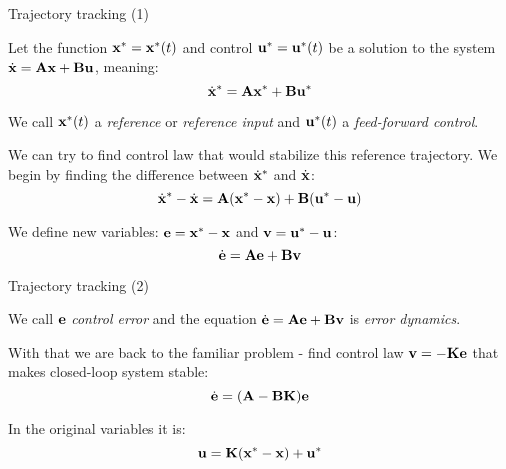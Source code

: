 \documentclass{beamer}
\begin{document}
\begin{frame}{Trajectory tracking (1)}
	\begin{flushleft}
		
		Let the function $\mathbf{x}^* = \mathbf{x}^*(t)$ and control $\mathbf{u}^* = \mathbf{u}^*(t)$ be a solution to the system $\dot{\mathbf{x}} = \mathbf{A}\mathbf{x} + \mathbf{B}\mathbf{u}$, meaning:
		\begin{equation}
			\dot{\mathbf{x}}^* = \mathbf{A}\mathbf{x}^* + \mathbf{B}\mathbf{u}^*
		\end{equation}
	
		We call $\mathbf{x}^*(t)$ a \emph{reference} or \emph{reference input} and $\mathbf{u}^*(t)$ a \emph{feed-forward control}.
		
		\bigskip
		
		We can try to find control law that would stabilize this reference trajectory. We begin by finding the difference between $\dot{\mathbf{x}}^*$ and $\dot{\mathbf{x}}$:
		\begin{equation}
			\dot{\mathbf{x}}^* - \dot{\mathbf{x}}= \mathbf{A}(\mathbf{x}^*-\mathbf{x}) + \mathbf{B}(\mathbf{u}^*-\mathbf{u})
		\end{equation}
		
		We define new variables: $\mathbf{e} = \mathbf{x}^* - \mathbf{x}$ and $\mathbf{v} = \mathbf{u}^* - \mathbf{u}$:
		\begin{equation}
			\dot{\mathbf{e}} = \mathbf{A}\mathbf{e} + \mathbf{B}\mathbf{v}
		\end{equation}
		
	\end{flushleft}
\end{frame}



\begin{frame}{Trajectory tracking (2)}
	\begin{flushleft}
		
		We call $\mathbf{e}$ \emph{control error} and the equation $\dot{\mathbf{e}} = \mathbf{A}\mathbf{e} + \mathbf{B}\mathbf{v}$ is \emph{error dynamics}.
		
		\bigskip
		
		With that we are back to the familiar problem - find control law $\mathbf{v} = -\mathbf{K}\mathbf{e}$ that makes closed-loop system stable:
		\begin{equation}
			\dot{\mathbf{e}} = (\mathbf{A} - \mathbf{B}\mathbf{K}) \mathbf{e}
		\end{equation}
		
		In the original variables it is:
		\begin{equation}
			\mathbf{u} = \mathbf{K}(\mathbf{x}^* - \mathbf{x}) + \mathbf{u}^*
		\end{equation}
		
	\end{flushleft}
\end{frame}
\end{document}
